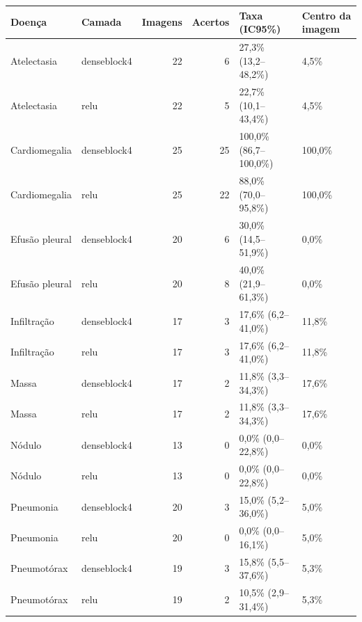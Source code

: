 \begin{tabular}{llrrll}
\toprule
Doença & Camada & Imagens & Acertos & Taxa (IC95\%) & Centro da imagem \\
\midrule
Atelectasia & denseblock4 & 22 & 6 & 27,3\% (13,2–48,2\%) & 4,5\% \\
Atelectasia & relu & 22 & 5 & 22,7\% (10,1–43,4\%) & 4,5\% \\
Cardiomegalia & denseblock4 & 25 & 25 & 100,0\% (86,7–100,0\%) & 100,0\% \\
Cardiomegalia & relu & 25 & 22 & 88,0\% (70,0–95,8\%) & 100,0\% \\
Efusão pleural & denseblock4 & 20 & 6 & 30,0\% (14,5–51,9\%) & 0,0\% \\
Efusão pleural & relu & 20 & 8 & 40,0\% (21,9–61,3\%) & 0,0\% \\
Infiltração & denseblock4 & 17 & 3 & 17,6\% (6,2–41,0\%) & 11,8\% \\
Infiltração & relu & 17 & 3 & 17,6\% (6,2–41,0\%) & 11,8\% \\
Massa & denseblock4 & 17 & 2 & 11,8\% (3,3–34,3\%) & 17,6\% \\
Massa & relu & 17 & 2 & 11,8\% (3,3–34,3\%) & 17,6\% \\
Nódulo & denseblock4 & 13 & 0 & 0,0\% (0,0–22,8\%) & 0,0\% \\
Nódulo & relu & 13 & 0 & 0,0\% (0,0–22,8\%) & 0,0\% \\
Pneumonia & denseblock4 & 20 & 3 & 15,0\% (5,2–36,0\%) & 5,0\% \\
Pneumonia & relu & 20 & 0 & 0,0\% (0,0–16,1\%) & 5,0\% \\
Pneumotórax & denseblock4 & 19 & 3 & 15,8\% (5,5–37,6\%) & 5,3\% \\
Pneumotórax & relu & 19 & 2 & 10,5\% (2,9–31,4\%) & 5,3\% \\
\bottomrule
\end{tabular}

